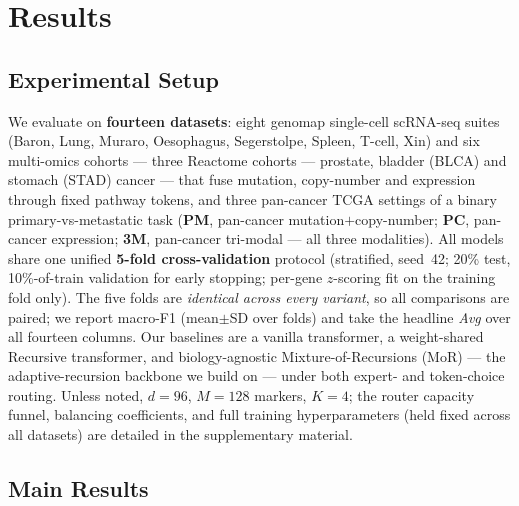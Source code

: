 \documentclass[letterpaper]{article}
\begin{document}
\section{Results}

\subsection{Experimental Setup}
We evaluate on \textbf{fourteen datasets}: eight genomap single-cell scRNA-seq suites
\cite{islam2023cartography} (Baron, Lung, Muraro, Oesophagus, Segerstolpe, Spleen, T-cell,
Xin) and six multi-omics cohorts --- three Reactome cohorts --- prostate, bladder (BLCA) and stomach (STAD) cancer --- that
fuse mutation, copy-number and expression through fixed pathway tokens, and three pan-cancer
TCGA settings of a binary primary-vs-metastatic task (\textbf{PM}, pan-cancer mutation$+$copy-number; \textbf{PC}, pan-cancer expression; \textbf{3M}, pan-cancer tri-modal --- all three modalities). All models share one unified \textbf{5-fold
cross-validation} protocol (stratified, seed~42; 20\% test, 10\%-of-train validation for early
stopping; per-gene $z$-scoring fit on the training fold only). The five folds are
\emph{identical across every variant}, so all comparisons are paired; we report macro-F1
(mean$\pm$SD over folds) and take the headline \emph{Avg} over all fourteen columns. Our
baselines are a vanilla transformer, a weight-shared Recursive transformer, and
biology-agnostic Mixture-of-Recursions (MoR) --- the adaptive-recursion backbone we build on
--- under both expert- and token-choice routing. Unless noted, $d{=}96$, $M{=}128$ markers,
$K{=}4$; the router capacity funnel, balancing coefficients, and full training hyperparameters
(held fixed across all datasets) are detailed in the supplementary material.

\subsection{Main Results}
\label{sec:main}
\end{document}
